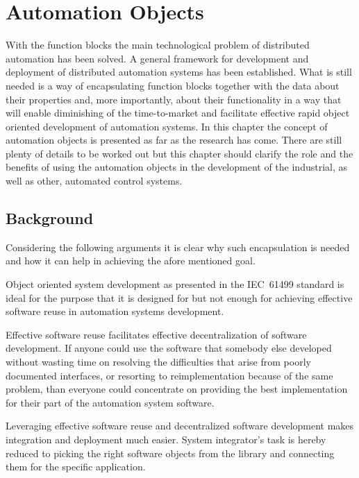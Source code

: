 
\chapter{Automation Objects}
\label{automationobjects}
With the function blocks the main technological problem of
distributed automation has been solved. A general framework
for development and deployment of distributed automation
systems has been established. What is still needed is a way
of encapsulating function blocks together with the data
about their properties and, more importantly, about their
functionality in a way that will enable diminishing of the
time-to-market and facilitate effective rapid object
oriented development of automation systems. In this chapter
the concept of automation objects is presented as far as the
research has come. There are still plenty of details to be
worked out but this chapter should clarify the role and the
benefits of using the automation objects in the development
of the industrial, as well as other, automated control
systems.


\section{Background}
Considering the following arguments it is clear why such
encapsulation is needed and how it can help in achieving the
afore mentioned goal.

Object oriented system development as presented in the
IEC~61499 standard is ideal for the purpose that it is
designed for but not enough for achieving effective software
reuse in automation systems development.

Effective software reuse facilitates effective
decentralization of software development. If anyone could
use the software that somebody else developed without
wasting time on resolving the difficulties that arise from
poorly documented interfaces, or resorting to
reimplementation because of the same problem, than everyone
could concentrate on providing the best implementation for
their part of the automation system software.

Leveraging effective software reuse and decentralized
software development makes integration and deployment much
easier. System integrator's task is hereby reduced to
picking the right software objects from the library and
connecting them for the specific application.

